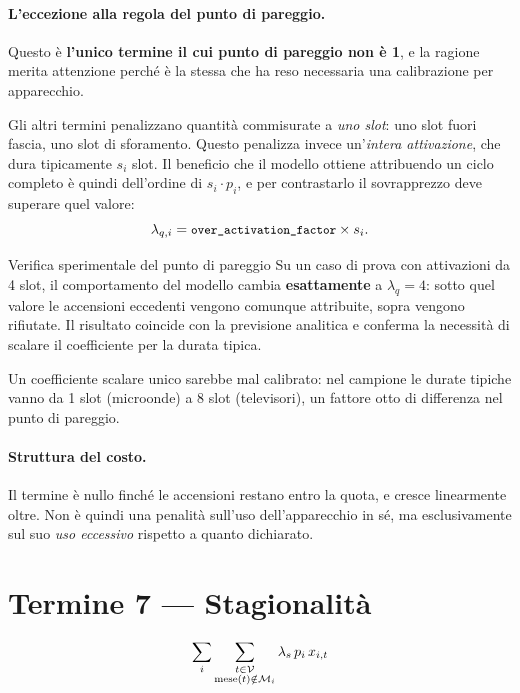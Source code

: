 \paragraph{L'eccezione alla regola del punto di pareggio.} Questo è \textbf{l'unico termine il cui
punto di pareggio non è 1}, e la ragione merita attenzione perché è la stessa che ha reso
necessaria una calibrazione per apparecchio.

Gli altri termini penalizzano quantità commisurate a \emph{uno slot}: uno slot fuori fascia, uno
slot di sforamento. Questo penalizza invece un'\emph{intera attivazione}, che dura tipicamente
$s_i$ slot. Il beneficio che il modello ottiene attribuendo un ciclo completo è quindi dell'ordine
di $s_i \cdot p_i$, e per contrastarlo il sovrapprezzo deve superare quel valore:
\begin{equation}
  \lambda_{q,i} = \texttt{\small over\_activation\_factor} \times s_i .
\end{equation}

\begin{notebox}{Verifica sperimentale del punto di pareggio}
Su un caso di prova con attivazioni da 4 slot, il comportamento del modello cambia
\textbf{esattamente} a $\lambda_q = 4$: sotto quel valore le accensioni eccedenti vengono comunque
attribuite, sopra vengono rifiutate. Il risultato coincide con la previsione analitica e conferma
la necessità di scalare il coefficiente per la durata tipica.

Un coefficiente scalare unico sarebbe mal calibrato: nel campione le durate tipiche vanno da 1
slot (microonde) a 8 slot (televisori), un fattore otto di differenza nel punto di pareggio.
\end{notebox}

\paragraph{Struttura del costo.} Il termine è nullo finché le accensioni restano entro la quota, e
cresce linearmente oltre. Non è quindi una penalità sull'uso dell'apparecchio in sé, ma
esclusivamente sul suo \emph{uso eccessivo} rispetto a quanto dichiarato.

\section{Termine 7 --- Stagionalità}

\begin{equation}
  \sum_{i} \sum_{\substack{t \in \mathcal{V} \\ \text{mese}(t) \notin \mathcal{M}_i}}
  \lambda_s \, p_i \, x_{i,t}
\end{equation}

